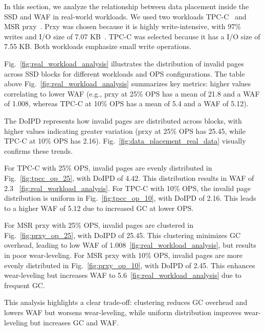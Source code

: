 \documentclass{ieeeaccess}
\begin{document}
In this section, we analyze the relationship between data placement inside the SSD and WAF in real-world workloads. We used two workloads TPC-C~\cite{tpc-c, tpcc-ieee-ex} and MSR prxy~\cite{write_off_loading}.
Prxy was chosen because it is highly write-intensive, with 97\% writes and I/O size of 7.07 KB~\cite{EnablingCostEffective, write_off_loading}.
TPC-C was selected because it has a I/O size of 7.55 KB.
Both workloads emphasize small write operations.

Fig.~\ref{fig:real_workload_analysis} illustrates the distribution of invalid pages across SSD blocks for different workloads and OPS configurations.
The table above Fig.~\ref{fig:real_workload_analysis} summarizes key metrics: higher values correlating to lower WAF (e.g., prxy at 25\% OPS has a mean of 21.8 and a WAF of 1.008, whereas TPC-C at 10\% OPS has a mean of 5.4 and a WAF of 5.12).

The DoIPD represents how invalid pages are distributed across blocks, with higher values indicating greater variation (prxy at 25\% OPS has 25.45, while TPC-C at 10\% OPS has 2.16). Fig.~\ref{fig:data_placement_real_data} visually confirms these trends.

For TPC-C with 25\% OPS, invalid pages are evenly distributed in Fig.~\ref{fig:tpcc_op_25}, with DoIPD of 4.42. This distribution results in WAF of 2.3 ~\ref{fig:real_workload_analysis}. For TPC-C with 10\% OPS, the invalid page distribution is uniform in Fig.~\ref{fig:tpcc_op_10}, with DoIPD of 2.16. This leads to a higher WAF of 5.12 due to increased GC at lower OPS.

For MSR prxy with 25\% OPS, invalid pages are clustered in Fig.~\ref{fig:prxy_op_25}, with DoIPD of 25.45. This clustering minimizes GC overhead, leading to low WAF of 1.008~\ref{fig:real_workload_analysis}, but results in poor wear-leveling. For MSR prxy with 10\% OPS, invalid pages are more evenly distributed in Fig.~\ref{fig:prxy_op_10}, with DoIPD of 2.45. This enhances wear-leveling but increases WAF to 5.6~\ref{fig:real_workload_analysis} due to frequent GC.

This analysis highlights a clear trade-off: clustering reduces GC overhead and lowers WAF but worsens wear-leveling, while uniform distribution improves wear-leveling but increases GC and WAF.
\end{document}
